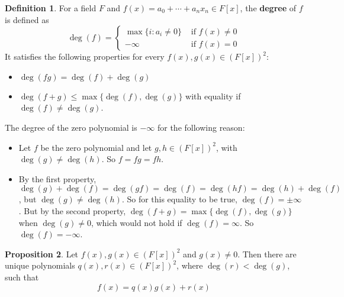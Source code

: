 \documentclass[12pt,a4paper]{article}
\theoremstyle{definition}
\newtheorem{definition}{Definition}[subsection]
\newtheorem{proposition}[definition]{Proposition}
\begin{document}
\begin{definition}\label{def:deg}
	For a field $F$ and $f(x) = a_0 + \cdots + a_n x_n \in F[x]$, the \textbf{degree} of $f$ is defined as
	\[
		\deg(f) = \begin{cases}
			\max \{ i: a_i \ne 0 \} & \text{ if } f(x) \ne 0 \\
			-\infty & \text{ if } f(x) = 0
		\end{cases}
	\]
	It satisfies the following properties for every $f(x), g(x) \in {(F[x])}^2$:
	\begin{itemize}
		\item $\deg(fg) = \deg(f) + \deg(g)$
		\item $\deg(f + g) \le \max \{ \deg(f), \deg(g) \}$ with equality if $\deg(f) \ne \deg(g)$.
	\end{itemize}
	The degree of the zero polynomial is $-\infty$ for the following reason:
	\begin{itemize}
		\item Let $f$ be the zero polynomial and let $g, h \in {(F[x])}^2$, with $\deg(g) \ne \deg(h)$. So $f = f g = f h$.
		\item By the first property, $\deg(g) + \deg(f) = \deg(g f) = \deg(f) = \deg(h f) = \deg(h) + \deg(f)$, but $\deg(g) \ne \deg(h)$. So for this equality to be true, $\deg(f) = \pm \infty$. But by the second property, $\deg(f + g) = \max \{ \deg(f), \deg(g) \}$ when $\deg(g) \ne 0$, which would not hold if $\deg(f) = \infty$. So $\deg(f) = -\infty$.
	\end{itemize}
\end{definition}

\begin{proposition}
	Let $f(x), g(x) \in {(F[x])}^2$ and $g(x) \ne 0$. Then there are unique polynomials $q(x), r(x) \in {(F[x])}^2$, where $\deg(r) < \deg(g)$, such that
	\[
		f(x) = q(x) g(x) + r(x)
	\]
\end{proposition}
\end{document}
